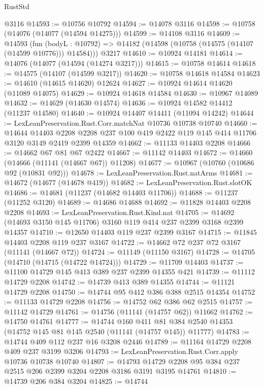 \begin{lexlean}{RustStd}
\begin{coremodule}
    @3116
@14593 := @10756 @10792
@14594 := @14078 @3116
@14598 := @10758 (@14076 (@14077 (@14594 @14275)))
@14599 := @14108 @3116
@14609 := @14593
    (fun (bodyL : @10792) => @14182 (@14598 (@10758 (@14575 (@14107 (@14599 @10776))) @14584)))
    @3217
@14610 := @10924 @14181
@14614 := @14076 (@14077 (@14594 (@14274 @3217)))
@14615 := @10758 @14614
@14618 := @14575 (@14107 (@14599 @3217))
@14620 := @10758 @14618 @14584
@14623 := @14610 (@14615 @14620) @12624
@14627 := @10924 @14614 @14620 (@11089 @14075)
@14629 := @10924 @14618 @14584
@14630 := @10967 @14089
@14632 := @14629 (@14630 @14574)
@14636 := @10924 @14582 @14412 (@11237 @14580)
@14640 := @10924 @14407 @14411 (@11094 @14242)
@14644 := LexLeanPreservation.Rust.Corr.matchNat @10736 @10738 @10740
@14660 := @14644
    @14403
    @2208
    @2208
    @237
    @100
    @419
    @2422
    @119
    @145
    @414
    @11706
    @3120
    @3149
    @2419
    @2399
    @14359
@14662 := @11133 @14403 @2208
@14666 := @14662 @67 @81 @67 @2422
@14667 := @11142 @14403
@14672 := @14660 (@14666 (@11141 (@14667 @67)) @11208)
@14677 := @10967 (@10760 (@10686 @92 (@10831 @92)))
@14678 := LexLeanPreservation.Rust.natArms
@14681 := @14672 (@14677 (@14678 @419))
@14682 := LexLeanPreservation.Rust.slotOK
@14686 := @14681 (@11237 (@14682 @14403 @11706))
@14688 := @11237 (@11252 @3120)
@14689 := @14686 @14688
@14692 := @11828 @14403 @2208 @2208
@14693 := LexLeanPreservation.Rust.Kind.nat
@14705 := @14692 (@14693 @3150 @145 @11706) @3160 @119 @414 @237 @2399 @3168 @2399 @14357
@14710 := @12650 @14403 @119 @237 @2399 @3167
@14715 := @11845 @14403 @2208 @119 @237 @3167
@14722 := @14662 @72 @237 @72 @3167 (@11141 (@14667 @72))
@14724 := @11149 (@11150 @3167)
@14728 := @14705 (@14710 (@14715 (@14722 @14724)))
@14729 := @11709 @14403
@14737 := @11100 @14729 @145 @413 @389 @237 @2399 @14355 @421
@14739 := @11112 @14729 @2208
@14742 := @14739 @413 @389 @14355
@14744 := @11121 @14729 @2208
@14750 := @14744 @95 @412 @386 @388 @2515 @14354
@14752 := @11133 @14729 @2208
@14756 := @14752 @62 @386 @62 @2515
@14757 := @11142 @14729
@14761 := @14756 (@11141 (@14757 @62)) @11662
@14762 := @14750 @14761
@14777 := @14744
    @160
    @411
    @81
    @384
    @2540
    @14353
    (@14752 @145 @81 @145 @2540 (@11141 (@14757 @145)) @11777)
@14783 := @14744 @409 @112 @237 @16 @3208 @2446
@14789 := @11164 @14729 @2208 @409 @237 @3199 @3206
@14793 := LexLeanPreservation.Rust.Corr.apply @10736 @10738 @10740
@14807 := @14793 @14729 @2208 @95 @384 @237 @2515 @206 @2399 @3204 @2208 @3186 @3191 @3195 @14761
@14810 := @14739 @206 @384 @3204
@14825 := @14744

\end{coremodule}
\end{lexlean}
